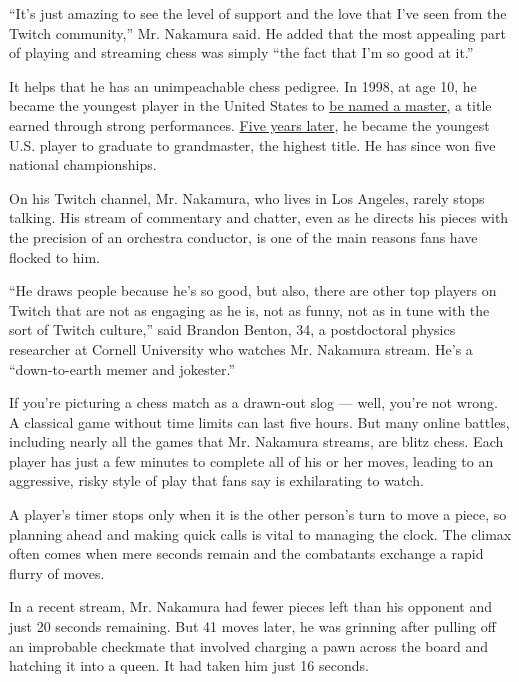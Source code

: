 ``It's just amazing to see the level of support and the love that I've
seen from the Twitch community,'' Mr. Nakamura said. He added that the
most appealing part of playing and streaming chess was simply ``the fact
that I'm so good at it.''

It helps that he has an unimpeachable chess pedigree. In 1998, at age
10, he became the youngest player in the United States to
\href{https://www.nytimes3xbfgragh.onion/1998/04/11/nyregion/pawns-with-king-size-dreams-boy-10-is-youngest-master-vaulting-past-his-brother.html}{be
named a master,} a title earned through strong performances.
\href{https://www.nytimes3xbfgragh.onion/2003/03/02/nyregion/next-generation-a-grand-master-and-he-s-only-15.html}{Five
years later}, he became the youngest U.S. player to graduate to
grandmaster, the highest title. He has since won five national
championships.

On his Twitch channel, Mr. Nakamura, who lives in Los Angeles, rarely
stops talking. His stream of commentary and chatter, even as he directs
his pieces with the precision of an orchestra conductor, is one of the
main reasons fans have flocked to him.

``He draws people because he's so good, but also, there are other top
players on Twitch that are not as engaging as he is, not as funny, not
as in tune with the sort of Twitch culture,'' said Brandon Benton, 34, a
postdoctoral physics researcher at Cornell University who watches Mr.
Nakamura stream. He's a ``down-to-earth memer and jokester.''

If you're picturing a chess match as a drawn-out slog --- well, you're
not wrong. A classical game without time limits can last five hours. But
many online battles, including nearly all the games that Mr. Nakamura
streams, are blitz chess. Each player has just a few minutes to complete
all of his or her moves, leading to an aggressive, risky style of play
that fans say is exhilarating to watch.

A player's timer stops only when it is the other person's turn to move a
piece, so planning ahead and making quick calls is vital to managing the
clock. The climax often comes when mere seconds remain and the
combatants exchange a rapid flurry of moves.

In a recent stream, Mr. Nakamura had fewer pieces left than his opponent
and just 20 seconds remaining. But 41 moves later, he was grinning after
pulling off an improbable checkmate that involved charging a pawn across
the board and hatching it into a queen. It had taken him just 16
seconds.

